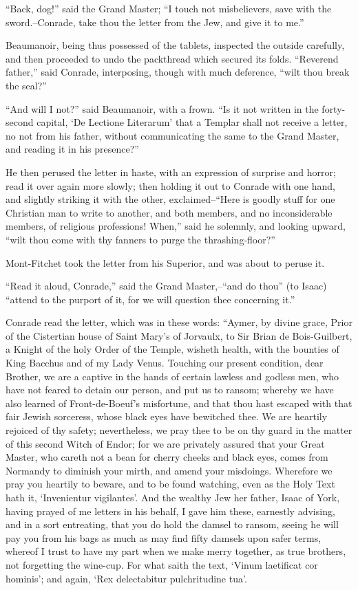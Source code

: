 ``Back, dog!'' said the Grand Master; ``I touch not misbelievers, save
with the sword.--Conrade, take thou the letter from the Jew, and give it
to me.''

Beaumanoir, being thus possessed of the tablets, inspected the outside
carefully, and then proceeded to undo the packthread which secured its
folds. ``Reverend father,'' said Conrade, interposing, though with much
deference, ``wilt thou break the seal?''

``And will I not?'' said Beaumanoir, with a frown. ``Is it not written
in the forty-second capital, `De Lectione Literarum' that a Templar
shall not receive a letter, no not from his father, without
communicating the same to the Grand Master, and reading it in his
presence?''

He then perused the letter in haste, with an expression of surprise and
horror; read it over again more slowly; then holding it out to Conrade
with one hand, and slightly striking it with the other,
exclaimed--``Here is goodly stuff for one Christian man to write to
another, and both members, and no inconsiderable members, of religious
professions! When,'' said he solemnly, and looking upward, ``wilt thou
come with thy fanners to purge the thrashing-floor?''

Mont-Fitchet took the letter from his Superior, and was about to peruse
it.

``Read it aloud, Conrade,'' said the Grand Master,--``and do thou'' (to
Isaac) ``attend to the purport of it, for we will question thee
concerning it.''

Conrade read the letter, which was in these words: ``Aymer, by divine
grace, Prior of the Cistertian house of Saint Mary's of Jorvaulx, to Sir
Brian de Bois-Guilbert, a Knight of the holy Order of the Temple,
wisheth health, with the bounties of King Bacchus and of my Lady Venus.
Touching our present condition, dear Brother, we are a captive in the
hands of certain lawless and godless men, who have not feared to detain
our person, and put us to ransom; whereby we have also learned of
Front-de-Boeuf's misfortune, and that thou hast escaped with that fair
Jewish sorceress, whose black eyes have bewitched thee. We are heartily
rejoiced of thy safety; nevertheless, we pray thee to be on thy guard in
the matter of this second Witch of Endor; for we are privately assured
that your Great Master, who careth not a bean for cherry cheeks and
black eyes, comes from Normandy to diminish your mirth, and amend your
misdoings. Wherefore we pray you heartily to beware, and to be found
watching, even as the Holy Text hath it, `Invenientur vigilantes'. And
the wealthy Jew her father, Isaac of York, having prayed of me letters
in his behalf, I gave him these, earnestly advising, and in a sort
entreating, that you do hold the damsel to ransom, seeing he will pay
you from his bags as much as may find fifty damsels upon safer terms,
whereof I trust to have my part when we make merry together, as true
brothers, not forgetting the wine-cup. For what saith the text, `Vinum
laetificat cor hominis'; and again, `Rex delectabitur pulchritudine
tua'.

